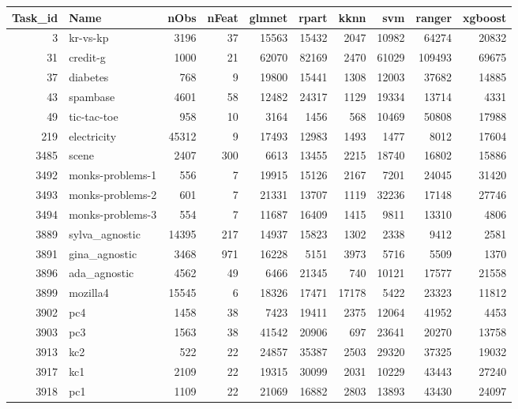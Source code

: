 \documentclass{article}
\begin{document}
\begin{table}[ht]
\centering
\begingroup\scriptsize
\begin{tabular}{rlrrrrrrrr}
  \hline
Task\_id & Name & nObs & nFeat & glmnet & rpart & kknn & svm & ranger & xgboost \\ 
  \hline
3 & kr-vs-kp & 3196 & 37 & 15563 & 15432 & 2047 & 10982 & 64274 & 20832 \\ 
  31 & credit-g & 1000 & 21 & 62070 & 82169 & 2470 & 61029 & 109493 & 69675 \\ 
  37 & diabetes & 768 & 9 & 19800 & 15441 & 1308 & 12003 & 37682 & 14885 \\ 
  43 & spambase & 4601 & 58 & 12482 & 24317 & 1129 & 19334 & 13714 & 4331 \\ 
  49 & tic-tac-toe & 958 & 10 & 3164 & 1456 & 568 & 10469 & 50808 & 17988 \\ 
  219 & electricity & 45312 & 9 & 17493 & 12983 & 1493 & 1477 & 8012 & 17604 \\ 
  3485 & scene & 2407 & 300 & 6613 & 13455 & 2215 & 18740 & 16802 & 15886 \\ 
  3492 & monks-problems-1 & 556 & 7 & 19915 & 15126 & 2167 & 7201 & 24045 & 31420 \\ 
  3493 & monks-problems-2 & 601 & 7 & 21331 & 13707 & 1119 & 32236 & 17148 & 27746 \\ 
  3494 & monks-problems-3 & 554 & 7 & 11687 & 16409 & 1415 & 9811 & 13310 & 4806 \\ 
  3889 & sylva\_agnostic & 14395 & 217 & 14937 & 15823 & 1302 & 2338 & 9412 & 2581 \\ 
  3891 & gina\_agnostic & 3468 & 971 & 16228 & 5151 & 3973 & 5716 & 5509 & 1370 \\ 
  3896 & ada\_agnostic & 4562 & 49 & 6466 & 21345 & 740 & 10121 & 17577 & 21558 \\ 
  3899 & mozilla4 & 15545 & 6 & 18326 & 17471 & 17178 & 5422 & 23323 & 11812 \\ 
  3902 & pc4 & 1458 & 38 & 7423 & 19411 & 2375 & 12064 & 41952 & 4453 \\ 
  3903 & pc3 & 1563 & 38 & 41542 & 20906 & 697 & 23641 & 20270 & 13758 \\ 
  3913 & kc2 & 522 & 22 & 24857 & 35387 & 2503 & 29320 & 37325 & 19032 \\ 
  3917 & kc1 & 2109 & 22 & 19315 & 30099 & 2031 & 10229 & 43443 & 27240 \\ 
  3918 & pc1 & 1109 & 22 & 21069 & 16882 & 2803 & 13893 & 43430 & 24097 \\ 

\end{tabular}
\end{table}
\end{document}
